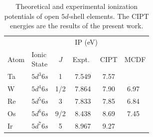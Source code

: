 \documentclass[10pt,a4paper, twoside]{report}
\begin{document}
\begin{table}[h]
\caption[Theoretical and experimental ionization potentials of open $5d$-shell elements.]{Theoretical and experimental ionization potentials of open $5d$-shell elements.  The CIPT energies are the results of the present work. \label{tab:IP}}
\begin{tabular}{llcccc}
\toprule
\toprule
           &                  & \multicolumn{3}{c}{IP (eV)} \\
Atom &  \parbox{1cm}{Ionic \\ State} & $J$ &  Expt.~\cite{NIST_ASD}   & CIPT  & MCDF \\
\midrule
Ta    & $5d^3 6s$  & 1   & 7.549    & 7.57  & \\
W     & $5d^4 6s$ & 1/2 & 7.864   & 7.90  &  6.97~\cite{MCDF-Sg}  \\
Re    & $5d^5 6s$ & 3   &  7.833  &  7.85  &  6.84~\cite{MCDF-BhHs} \\
Os    & $5d^6 6s$ & 9/2 & 8.438  &  8.69  &  7.45~\cite{MCDF-BhHs} \\
Ir      & $5d^7 6s$ & 5    & 8.967 &  9.27  & \\
\bottomrule
\bottomrule
\end{tabular}
\end{table}
\end{document}
